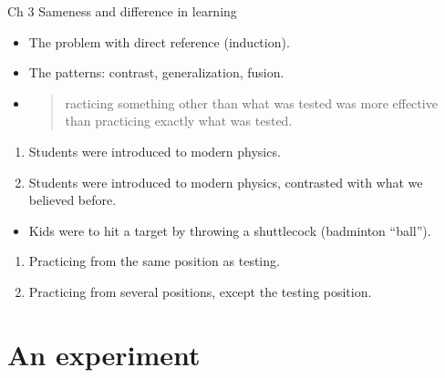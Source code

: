 \begin{frame}
  \begin{block}{Ch 3 Sameness and difference in learning}
    \begin{itemize}
      \item The problem with direct reference (induction).
      \item The patterns: contrast, generalization, fusion.
      \item \blockcquote[p.~71]{NecessaryConditionsOfLearning}{%
          racticing something other than what was tested was more 
          effective than practicing exactly what was tested.%
        }
    \end{itemize}
  \end{block}
\end{frame}

\begin{frame}
  \begin{example}[Physics]
    \begin{enumerate}
      \item Students were introduced to modern physics.
      \item Students were introduced to modern physics, contrasted with what we 
        believed before.
    \end{enumerate}
  \end{example}
\end{frame}

\begin{frame}
  \begin{example}
    \begin{itemize}
      \item Kids were to hit a target by throwing a shuttlecock (badminton 
        \enquote{ball}).
    \end{itemize}
    \begin{enumerate}
      \item Practicing from the same position as testing.
      \item Practicing from several positions, except the testing position.
    \end{enumerate}
  \end{example}
\end{frame}

\section{An experiment}


